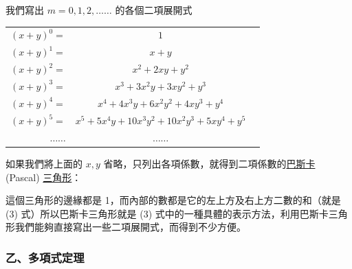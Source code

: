 我們寫出 $m = 0, 1, 2, \dots\dots$ 的各個二項展開式
\begin{center}
\begin{tabular}{rcc}
$(x + y)^0 =$ & $1$ \\
$(x + y)^1 =$ & $x + y$ \\
$(x + y)^2 =$ & $x^2 + 2xy + y^2$ \\
$(x + y)^3 =$ & $x^3 + 3x^2 y + 3xy^2 + y^3$ \\
$(x + y)^4 =$ & $x^4 + 4x^3 y + 6x^2 y^2 + 4xy^3 + y^4$ \\
$(x + y)^5 =$ & $x^5 + 5x^4 y + 10x^3 y^2 + 10x^2 y^3 + 5xy^4 + y^5$ \\
$\dots\dots$ & $\dots\dots$
\end{tabular}
\end{center}
如果我們將上面的 $x, y$ 省略，只列出各項係數，就得到二項係數的\underline{巴斯卡} (Pascal) \underline{三角形}：

\begin{center}
\end{center}

這個三角形的邊緣都是 1，而內部的數都是它的左上方及右上方二數的和（就是 (3) 式）所以巴斯卡三角形就是 (3) 式中的一種具體的表示方法，利用巴斯卡三角形我們能夠直接寫出一些二項展開式，而得到不少方便。

\subsubsection*{乙、多項式定理}\label{subsec:b5-2-4-b}

